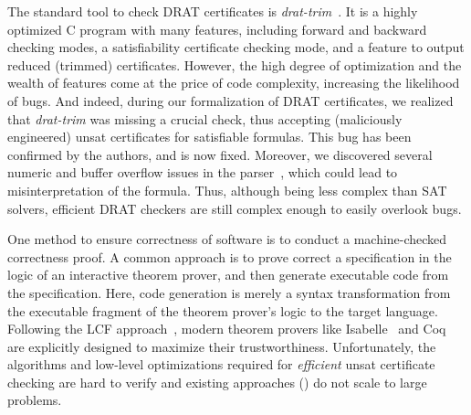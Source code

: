 \documentclass[smallcondensed]{svjour3}     %
\begin{document}
The standard tool to check DRAT certificates is {\sl drat-trim}~\cite{WHH14,drat-trim-webpage}. 
It is a highly optimized C program with many features, including forward and backward checking modes, a satisfiability certificate checking mode,
and a feature to output reduced (trimmed) certificates.
% 
% 
However, the high degree of optimization and the wealth of features come at the price of code complexity, increasing the likelihood of bugs. And indeed, 
during our formalization of DRAT certificates, we realized that {\sl drat-trim} was missing a crucial check, thus accepting (maliciously engineered) unsat certificates 
for satisfiable formulas. This bug has been confirmed by the authors, and is now fixed.
Moreover, we discovered several numeric and buffer overflow issues in the parser~\cite{drat-trim-issues}, which could lead to misinterpretation of the formula.
Thus, although being less complex than SAT solvers, efficient DRAT checkers are still complex enough to easily overlook bugs.

One method to ensure correctness of software is to conduct a machine-checked correctness proof. 
A common approach is to prove correct a specification in the logic of an interactive theorem prover, and then generate executable code from 
the specification. Here, code generation is merely a syntax transformation from the executable fragment of the theorem prover's logic to the target language.
Following the LCF approach~\cite{Gord00}, modern theorem provers like Isabelle~\cite{NPW02} and Coq~\cite{BeCa10} are explicitly designed to maximize their trustworthiness.
Unfortunately, the algorithms and low-level optimizations required for \emph{efficient} unsat certificate checking are 
hard to verify and existing approaches (\eg \cite{DFM10,WHH13}) do not scale to large problems.
\end{document}
